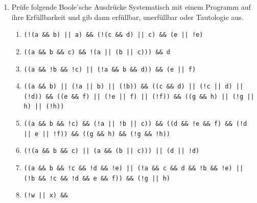 \documentclass{../../sheet}
\begin{document}
\begin{enumerate}
    \item Prüfe folgende Boole'sche Ausdrücke Systematisch mit einem Programm auf ihre Erfüllbarkeit und gib dann erfüllbar, unerfüllbar oder Tautologie aus.
          \begin{enumerate}
              \item \begin{ausgabe} \texttt{(!(a \&\& b) || a) \&\& (!(c \&\& d) || c) \&\& (e || !e)} \end{ausgabe} %
              \item \begin{ausgabe} \texttt{((a \&\& b \&\& c) \&\& !(a || (b || c))) \&\& d} \end{ausgabe} %
              \item \begin{ausgabe} \texttt{((a \&\& !b \&\& !c) || (!a \&\& b \&\& d)) \&\& (e || f)} \end{ausgabe} %
              \item \begin{ausgabe} \texttt{((a \&\& b) || (!a || b) || (!b)) \&\&
                            ((c \&\& d) || (!c || d) || (!d)) \&\&
                            ((e \&\& f) || (!e || f) || (!f)) \&\&
                            ((g \&\& h) || (!g || h) || (!h))}
                    \end{ausgabe} %
              \item \begin{ausgabe} \texttt{((a \&\& b \&\& !c) \&\& (!a || !b || c)) \&\&
                            ((d \&\& !e \&\& f) \&\& (!d || e || !f)) \&\&
                            ((g \&\& h) \&\& (!g \&\& !h))}
                    \end{ausgabe} %
              \item \begin{ausgabe} \texttt{(!(a \&\& b \&\& c) || (a \&\& (b || c))) || (d || !d)} \end{ausgabe} %
              \item \begin{ausgabe} \texttt{((a \&\& b \&\& !c \&\& !d \&\& !e) ||
                            (!a \&\& c \&\& d \&\& !b \&\& !e) ||
                            (!b \&\& !c \&\& !d \&\& e \&\& f)) \&\& (!g || h)}
                    \end{ausgabe} %
              \item \begin{ausgabe} \texttt{(!w || x) \&\&
}
\end{ausgabe}
\end{enumerate}
\end{enumerate}
\end{document}
